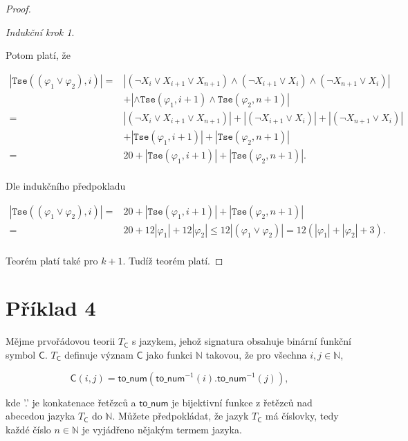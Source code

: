 \documentclass[a4paper, 12pt]{article}
\theoremstyle{definition}
\theoremstyle{definition}
\theoremstyle{definition}
\theoremstyle{remark}
\theoremstyle{remark}
\theoremstyle{remark}
\theoremstyle{remark}
\newtheorem*{inductionstep}{Indukční krok}
\begin{document}
\begin{proof}
\begin{inductionstep}
\begin{itemize}
        

        Potom platí, že

        \begin{align*}
            |\texttt{Tse}((\varphi_1 \lor \varphi_2), i)| = &|(\neg X_i \lor X_{i+1} \lor X_{n+1}) \wedge (\neg X_{i+1} \lor X_i) \wedge (\neg X_{n+1} \lor X_i)| \\
            &+ |\wedge \texttt{Tse}(\varphi_1, i + 1) \wedge \texttt{Tse}(\varphi_2, n + 1)| \\
            = &|(\neg X_i \lor X_{i+1} \lor X_{n+1})| + |(\neg X_{i+1} \lor X_i)| + |(\neg X_{n+1} \lor X_i)| \\
            &+ |\texttt{Tse}(\varphi_1, i + 1)| + |\texttt{Tse}(\varphi_2, n + 1)| \\
            = & 20 + |\texttt{Tse}(\varphi_1, i + 1)| + |\texttt{Tse}(\varphi_2, n + 1)|. \\
        \end{align*}

        Dle indukčního předpokladu

        \begin{align*}
            |\texttt{Tse}((\varphi_1 \lor \varphi_2), i)| = &20 + |\texttt{Tse}(\varphi_1, i + 1)| + |\texttt{Tse}(\varphi_2, n + 1)| \\
            = &20 + 12 |\varphi_1| + 12|\varphi_2| \leq 12 |(\varphi_1 \lor \varphi_2)| = 12(|\varphi_1| + |\varphi_2| + 3). \\
        \end{align*}
    \end{itemize}
    \end{inductionstep}

    Teorém platí také pro $k + 1$. Tudíž teorém platí.
\end{proof}

\section{Příklad 4}
Mějme prvořádovou teorii $T_\mathsf{C}$ s jazykem, jehož signatura obsahuje binární funkční symbol $\mathsf{C}$. $T_\mathsf{C}$ definuje význam $\mathsf{C}$ jako funkci $\mathbb{N}$ takovou, že pro všechna $i, j \in \mathbb{N}$,

$$\mathsf{C}(i, j) = \mathsf{to\_num}(\mathsf{to\_num}^{-1}(i).\mathsf{to\_num}^{-1}(j)),$$

\noindent
kde '.' je konkatenace řetězců a $\mathsf{to\_num}$ je bijektivní funkce z řetězců nad abecedou jazyka $T_\mathsf{C}$ do $\mathbb{N}$. Můžete předpokládat, že jazyk $T_\mathsf{C}$ má číslovky, tedy každé číslo $n \in \mathbb{N}$ je vyjádřeno nějakým termem jazyka.
\end{document}
